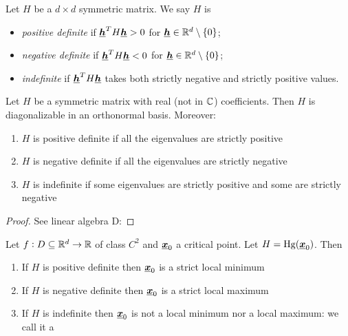 \documentclass[12pt]{extarticle}
\renewcommand{\vec}[1]{\uvec{#1}}
\newcommand{\Hg}{{\operatorfont Hg}}
\begin{document}
\begin{definition}
    Let $H$ be a $d\times d$ symmetric matrix. We say $H$ is
    \begin{itemize}
        \item \emph{positive definite} if $\vec h^T H \vec h > 0$ for $\vec h \in \R^d \setminus \{0\}$;
        \item \emph{negative definite} if $\vec h^T H \vec h < 0$ for $\vec h \in \R^d \setminus \{0\}$;
        \item \emph{indefinite} if $\vec h^T H \vec h$ takes both strictly negative and strictly positive values.
    \end{itemize}
\end{definition}

\begin{theorem}
    Let $H$ be a symmetric matrix with real (not in $\mathbb{C}$) coefficients.
    Then $H$ is diagonalizable in an orthonormal basis.
    Moreover:
    \begin{enumerate}[label=\roman*.]
        \item $H$ is positive definite if all the eigenvalues are strictly positive
        \item $H$ is negative definite if all the eigenvalues are strictly negative
        \item $H$ is indefinite if some eigenvalues are strictly positive and some are strictly negative
    \end{enumerate}
\end{theorem}
\begin{proof}
    See linear algebra D:
\end{proof}

\begin{theorem}
    Let $f: D\subseteq \mathbb{R}^d \to \mathbb{R}$ of class $C^2$ and $\vec x_0$ a critical point.
    Let $H = \Hg(\vec x_0)$.
    Then
    \begin{enumerate}[label=\roman*.]
        \item If $H$ is positive definite then $\vec x_0$ is a strict local minimum
        \item If $H$ is negative definite then $\vec x_0$ is a strict local maximum
        \item If $H$ is indefinite then $\vec x_0$ is not a local minimum nor a local maximum: we call it a 
    \end{enumerate}
\end{theorem}
\end{document}
